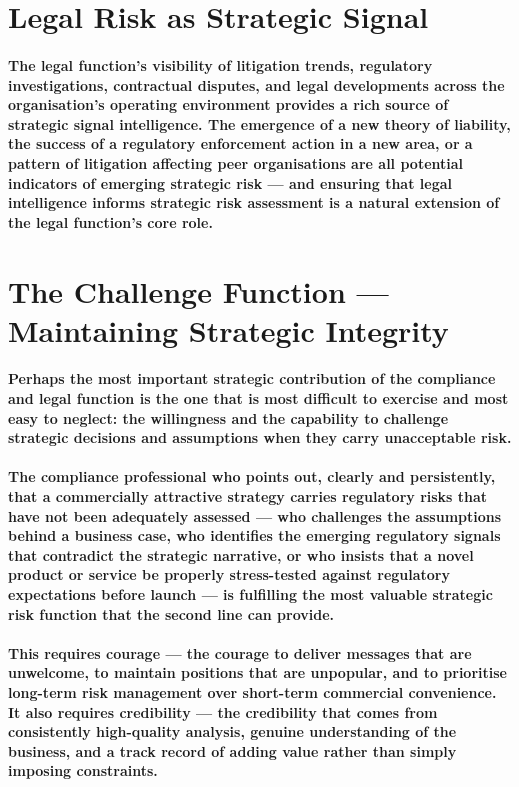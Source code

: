 \section{Legal Risk as Strategic Signal}
\paragraph{The legal function's visibility of litigation trends, regulatory investigations, contractual disputes, and legal developments across the organisation's operating environment provides a rich source of strategic signal intelligence. The emergence of a new theory of liability, the success of a regulatory enforcement action in a new area, or a pattern of litigation affecting peer organisations are all potential indicators of emerging strategic risk — and ensuring that legal intelligence informs strategic risk assessment is a natural extension of the legal function's core role.}

\section{The Challenge Function — Maintaining Strategic Integrity}
\paragraph{Perhaps the most important strategic contribution of the compliance and legal function is the one that is most difficult to exercise and most easy to neglect: the willingness and the capability to challenge strategic decisions and assumptions when they carry unacceptable risk.}
\paragraph{The compliance professional who points out, clearly and persistently, that a commercially attractive strategy carries regulatory risks that have not been adequately assessed — who challenges the assumptions behind a business case, who identifies the emerging regulatory signals that contradict the strategic narrative, or who insists that a novel product or service be properly stress-tested against regulatory expectations before launch — is fulfilling the most valuable strategic risk function that the second line can provide.}
\paragraph{This requires courage — the courage to deliver messages that are unwelcome, to maintain positions that are unpopular, and to prioritise long-term risk management over short-term commercial convenience. It also requires credibility — the credibility that comes from consistently high-quality analysis, genuine understanding of the business, and a track record of adding value rather than simply imposing constraints.}
